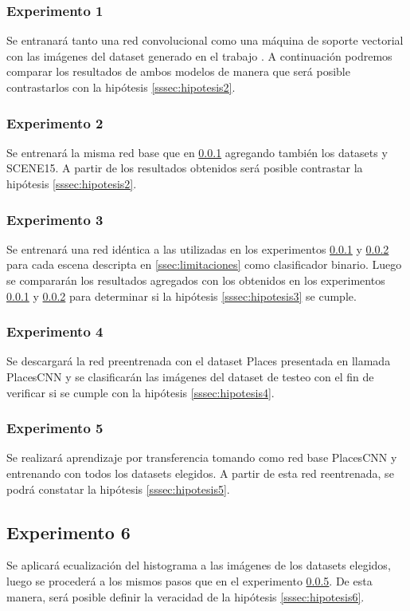 \subsubsection{Experimento 1} \label{sssec:exp1}
Se entranará tanto una red convolucional como una máquina de soporte vectorial con las imágenes del dataset generado en el trabajo \cite{vision_based_real_estate_price_estimation}. A continuación podremos comparar los resultados de ambos modelos de manera que será posible contrastarlos con la hipótesis \ref{sssec:hipotesis2}.

\subsubsection{Experimento 2} \label{sssec:exp2}
Se entrenará la misma red base que en \ref{sssec:exp1} agregando también los datasets \cite{lstm_real_estate} y SCENE15. A partir de los resultados obtenidos será posible contrastar la hipótesis \ref{sssec:hipotesis2}.

\subsubsection{Experimento 3} \label{sssec:exp3}
Se entrenará una red idéntica a las utilizadas en los experimentos \ref{sssec:exp1} y \ref{sssec:exp2} para cada escena descripta en \ref{ssec:limitaciones} como clasificador binario. Luego se compararán los resultados agregados con los obtenidos en los experimentos \ref{sssec:exp1} y \ref{sssec:exp2} para determinar si la hipótesis \ref{sssec:hipotesis3} se cumple.

\subsubsection{Experimento 4} \label{sssec:exp4}
Se descargará la red preentrenada con el dataset Places presentada en \cite{learning_deep_features} llamada PlacesCNN y se clasificarán las imágenes del dataset de testeo con el fin de verificar si se cumple con la hipótesis \ref{sssec:hipotesis4}.

\subsubsection{Experimento 5} \label{sssec:exp5}
Se realizará aprendizaje por transferencia tomando como red base PlacesCNN y entrenando con todos los datasets elegidos. A partir de esta red reentrenada, se podrá constatar la hipótesis \ref{sssec:hipotesis5}.

\subsection{Experimento 6} \label{sssec:exp6}
Se aplicará ecualización del histograma a las imágenes de los datasets elegidos, luego se procederá a los mismos pasos que en el experimento \ref{sssec:exp5}. De esta manera, será posible definir la veracidad de la hipótesis \ref{sssec:hipotesis6}.